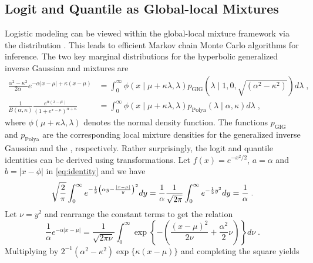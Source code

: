 \documentclass[lineno]{biometrika}
\begin{document}
\subsection{Logit and Quantile as Global-local Mixtures}
Logistic modeling can be viewed within the global-local mixture framework via
the \PG{} distribution \citep{polson_bayesian_2013}. This leads to efficient
Markov chain Monte Carlo algorithms for inference.  The two key marginal
distributions for the hyperbolic generalized inverse Gaussian 
\citep{barndorff1982normal} and \PG{} mixtures are
\begin{align}
  \frac{\alpha^2-\kappa^2}{2\alpha} e^{-\alpha|x-\mu| + \kappa(x-\mu)} 
  & = \int_0^{\infty} \phi(x \mid \mu + \kappa \lambda, \lambda) 
  p_{\mathrm{GIG}}(\lambda \mid 1,0,\sqrt{(\alpha^2-\kappa^2)}) d\lambda
  \;, 
  \label{eq:GIG}
  \\
  \frac{1}{B(\alpha,\kappa)} \frac{e^{\alpha(x-\mu)}}{(1+e^{x-\mu})^{\alpha + \kappa}} 
  & = \int_0^{\infty} \phi( x \mid \mu + \kappa \lambda, \lambda) 
  p_{\mathrm{Polya}}(\lambda \mid \alpha,\kappa)  d\lambda
  \;, 
  \label{eq:polya}
\end{align}
where $\phi(\mu + \kappa \lambda, \lambda)$ denotes the normal density
function.  The functions $p_{\mathrm{GIG}}$ and $p_{\mathrm{Polya}}$ are
the corresponding local mixture densities for the generalized inverse Gaussian and
the \PG{}, respectively.  Rather surprisingly, the logit and quantile
identities can be derived using \CS{} transformations.  
Let $f(x) = e^{-x^2/2}$, $a = \alpha$ and $b = |x-\phi|$ in \eqref{eq:identity}
and we have 
$$
\sqrt{\frac{2}{\pi}} \int_{0}^{\infty} 
e^{-\frac{1}{2} \left(\alpha y - \frac{|x-\mu|}{y} \right)^2} dy 
= \frac{1}{\alpha}\frac{1}{\sqrt{2\pi}} \int_0^{\infty} e^{-\frac{1}{2} y^2} dy 
= \frac{1}{\alpha}
\;.
$$
Let $\nu = y^2$ and rearrange the constant terms to get the relation
$$
\frac{1}{\alpha} e^{-\alpha|x-\mu|} = 
\frac{1}{\sqrt{2 \pi \nu}} \int_{0}^{\infty} 
\exp\left\{-\left( \frac{(x-\mu)^2}{2\nu} + \frac{\alpha^2}{2} \nu \right)\right\} 
d\nu
\;.
$$
Multiplying by $2^{-1}(\alpha^2-\kappa^2) \exp\{\kappa(x-\mu)\}$ and
completing the square yields
\end{document}
